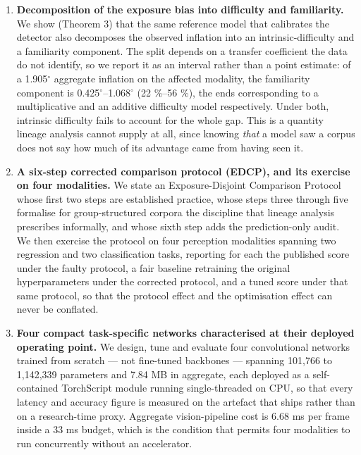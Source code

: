 \begin{enumerate}
\item \textbf{Decomposition of the exposure bias into difficulty and familiarity.} We show (Theorem 3) that the same reference model that calibrates the detector also decomposes the observed inflation into an intrinsic-difficulty and a familiarity component. The split depends on a transfer coefficient the data do not identify, so we report it as an interval rather than a point estimate: of a 1.905$^{\circ}$ aggregate inflation on the affected modality, the familiarity component is 0.425$^{\circ}$--1.068$^{\circ}$ (22 \%--56 \%), the ends corresponding to a multiplicative and an additive difficulty model respectively. Under both, intrinsic difficulty fails to account for the whole gap. This is a quantity lineage analysis cannot supply at all, since knowing \emph{that} a model saw a corpus does not say how much of its advantage came from having seen it.

\item \textbf{A six-step corrected comparison protocol (EDCP), and its exercise on four modalities.} We state an Exposure-Disjoint Comparison Protocol whose first two steps are established practice, whose steps three through five formalise for group-structured corpora the discipline that lineage analysis prescribes informally, and whose sixth step adds the prediction-only audit. We then exercise the protocol on four perception modalities spanning two regression and two classification tasks, reporting for each the published score under the faulty protocol, a fair baseline retraining the original hyperparameters under the corrected protocol, and a tuned score under that same protocol, so that the protocol effect and the optimisation effect can never be conflated.

\item \textbf{Four compact task-specific networks characterised at their deployed operating point.} We design, tune and evaluate four convolutional networks trained from scratch --- not fine-tuned backbones --- spanning 101,766 to 1,142,339 parameters and 7.84 MB in aggregate, each deployed as a self-contained TorchScript module  running single-threaded on CPU, so that every latency and accuracy figure is measured on the artefact that ships rather than on a research-time proxy. Aggregate vision-pipeline cost is 6.68 ms per frame inside a 33 ms budget, which is the condition that permits four modalities to run concurrently without an accelerator.


\end{enumerate}
